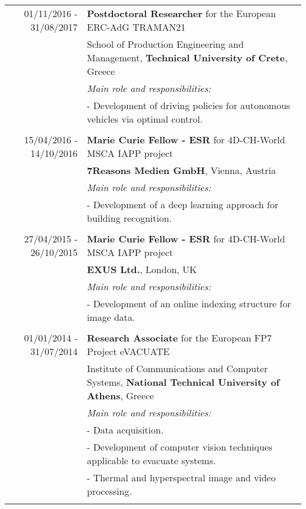 \documentclass[a4paper,10pt]{article}
\begin{document}
\begin{longtable}{r|p{11cm}}
	01/11/2016 - 31/08/2017 & \textbf{Postdoctoral Researcher} for the European ERC-AdG TRAMAN21  \\
	& School of Production Engineering and Management, \textbf{Technical University of Crete}, Greece\\
	& \textit{\small{Main role and responsibilities:}} \\
	&\footnotesize{- Development of driving policies for autonomous vehicles via optimal control.}\\ 
	\multicolumn{2}{c}{} \\
	
	15/04/2016 - 14/10/2016 & \textbf{Marie Curie Fellow - ESR} for 4D-CH-World MSCA IAPP project \\
	& \textbf{7Reasons Medien GmbH}, Vienna, Austria\\
	& \textit{\small{Main role and responsibilities:}} \\
	&\footnotesize{- Development of a deep learning approach for building recognition.}\\
	\multicolumn{2}{c}{} \\	
	
	27/04/2015 - 26/10/2015 & \textbf{Marie Curie Fellow - ESR} for 4D-CH-World MSCA IAPP project \\
	& \textbf{EXUS Ltd.}, London, UK\\
	& \textit{\small{Main role and responsibilities:}} \\
	&\footnotesize{- Development of an online indexing structure for image data.}\\
	\multicolumn{2}{c}{} \\	
	
	01/01/2014 - 31/07/2014 & \textbf{Research Associate} for the European FP7 Project eVACUATE \\ 
	& Institute of Communications and Computer Systems, \textbf{National Technical University of Athens}, Greece\\
	& \textit{\small{Main role and responsibilities:}} \\
	& \footnotesize{- Data acquisition.}\\
	& \footnotesize{- Development of computer vision techniques applicable to evacuate systems.}\\
	& \footnotesize{- Thermal and hyperspectral image and video processing.}\\
	\multicolumn{2}{c}{} \\
	

\end{longtable}
\end{document}
